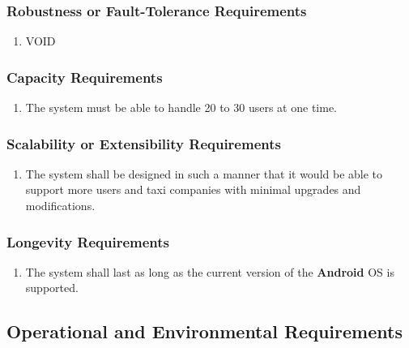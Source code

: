 \documentclass[english]{article}
\begin{document}
\subsubsection{Robustness or Fault-Tolerance Requirements}
\label{ssub:robustness_or_fault_tolerance_requirements}
\begin{enumerate}[{RFR}1. ]
	\item VOID
\end{enumerate}

\subsubsection{Capacity Requirements}
\label{ssub:capacity_requirements}
\begin{enumerate}[{CR}1. ]
	\item The system must be able to handle 20 to 30 users at one time. 
\end{enumerate}

\subsubsection{Scalability or Extensibility Requirements}
\label{ssub:scalability_or_extensibility_requirements}
\begin{enumerate}[{SER}1. ]
	\item The system shall be designed in such a manner that it would be able to support more users and taxi companies with minimal upgrades and modifications.
\end{enumerate}

\subsubsection{Longevity Requirements}
\label{ssub:longevity_requirements}
\begin{enumerate}[{LONGR}1. ]
	\item The system shall last as long as the current version of the  \textbf{Android} OS is supported.
\end{enumerate}


\subsection{Operational and Environmental Requirements}
\label{sub:operational_and_environmental_requirements}
\end{document}
